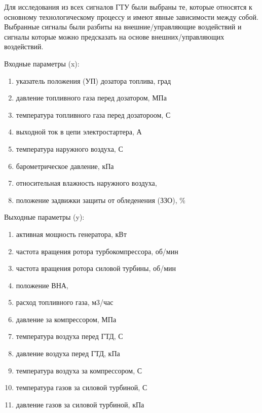 \documentclass[12pt,a4paper]{article}
\begin{document}
Для исследования из всех сигналов ГТУ были выбраны те, которые относятся к основному технологическому процессу и имеют явные зависимости между собой. Выбранные сигналы были разбиты на внешние/управляющие воздействий и сигналы которые можно предсказать на основе внешних/управляющих воздействий.

\begin{description}
	\item Входные параметры (x):
	\begin{enumerate}
		\item указатель положения (УП) дозатора топлива, град
		\item давление топливного газа перед дозатором, МПа
		\item температура топливного газа перед дозатороом, \degree С
		\item выходной ток в цепи электростартера, А
		\item температура наружного воздуха, \degree С
		\item барометрическое давление, кПа
		\item относительная влажность наружного воздуха, %
		\item положение задвижки защиты от обледенения (ЗЗО), \%

	\end{enumerate}
	\item Выходные параметры (y):
	\begin{enumerate}
		\item активная мощность генератора, кВт
		\item частота вращения ротора турбокомпрессора, об/мин
		\item частота вращения ротора силовой турбины, об/мин
		\item положение ВНА, \degree
		\item расход топливного газа, м3/час
		\item давление за компрессором, МПа
		\item температура воздуха перед ГТД, \degree С
		\item давление воздуха перед ГТД, кПа
		\item температура воздуха за компрессором, \degree С
		\item температура газов за силовой турбиной, \degree С
		\item давление газов за силовой турбиной, кПа
	\end{enumerate}
\end{description}
\end{document}
